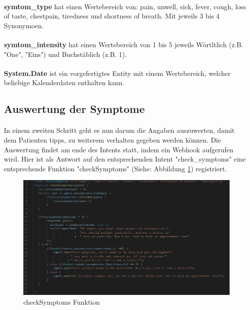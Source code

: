 \documentclass[11pt,a4paper]{article}
\begin{document}
            \paragraph{}
                \textbf{symtom\_type} hat einen Wertebereich von: pain, unwell,
                sick, fever, cough, loss of taste, chestpain, tiredness und shortness of breath. Mit jeweils 3 bis 4 
                Synonymoen.
            
            \paragraph{}
                \textbf{symtom\_intensity} hat einen Wertebereich von 1 bis 5 jeweils Wörtltlich (z.B. "One", "Eins") und
                Buchstäblich (z.B. 1).
            
            \paragraph{}
                \textbf{System.Date} ist ein vorgefertigtes Entity mit einem Wertebereich, welcher beliebige Kalenderdaten
                enthalten kann.
    \subsection{Auswertung der Symptome}
        \paragraph{}
            In einem zweiten Schritt geht es nun darum die Angaben auszuwerten, damit dem Patienten tipps, zu weiterem verhalten
            gegeben werden können. Die Auswertung findet am ende des Intents statt, indem ein Webhook aufgerufen wird.
            Hier ist als Antwort auf den entsprechenden Intent "check\_symptoms" eine entsprechende Funktion "checkSymptoms" (Siehe: Abbildung \ref{fig:checksymptomsfunction})
            registriert.
        \begin{figure}[h!]
            \begin{center}
                \includegraphics[width=\linewidth]{checkSymptoms.png}
                \caption{checkSymptoms Funktion}
	            \label{fig:checksymptomsfunction}
            \end{center}
        \end{figure}
\end{document}
